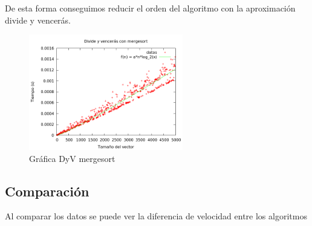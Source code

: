 \begin{center}
\end{center}

De esta forma conseguimos reducir el orden del algoritmo con la aproximación divide y vencerás.

\begin{figure}[h] 
\centering
	\includegraphics[width=0.6\textwidth]{../Opcional/Graficas/dyv_mergesort_bruno.png}
	\caption{Gráfica DyV mergesort} 
	\label{fig:perros} 
\end{figure}
\newpage

\subsection{Comparación}
Al comparar los datos se puede ver la diferencia de velocidad entre los algoritmos\\

